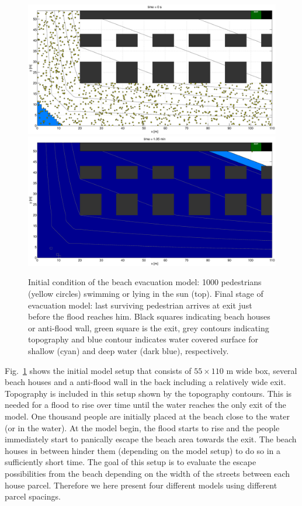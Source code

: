 \documentclass[11pt]{article}
\begin{document}
\begin{figure}
	\centering
	\includegraphics[width=1.1\textwidth]{figures/BeachEvacuationOneExitStreetWidth7_Flood0_1_000000.eps}
		\qquad
	\includegraphics[width=1.1\textwidth]{figures/BeachEvacuationOneExitStreetWidth7_Flood0_1_006300.eps}
	\caption{Initial condition of the beach evacuation model: 1000 pedestrians (yellow circles) swimming or lying in the sun (top). Final stage of evacuation model: last surviving pedestrian arrives at exit just before the flood reaches him. Black squares indicating beach houses or anti-flood wall, green square is the exit, grey contours indicating topography and blue contour indicates water covered surface for shallow (cyan) and deep water (dark blue), respectively.}
	\label{fig:beach_initial}
\end{figure}

Fig.~\ref{fig:beach_initial} shows the initial model setup that consists of $55\times110$ m wide box, several beach houses and a anti-flood wall in the back including a relatively wide exit. Topography is included in this setup shown by the topography contours. This is needed for a flood to rise over time until the water reaches the only exit of the model. One thousand people are initially placed at the beach close to the water (or in the water). At the model begin, the flood starts to rise and the people immediately start to panically escape the beach area towards the exit. The beach houses in between hinder them (depending on the model setup) to do so in a sufficiently short time. The goal of this setup is to evaluate the escape possibilities from the beach depending on the width of the streets between each house parcel. Therefore we here present four different models using different parcel spacings.
\end{document}
